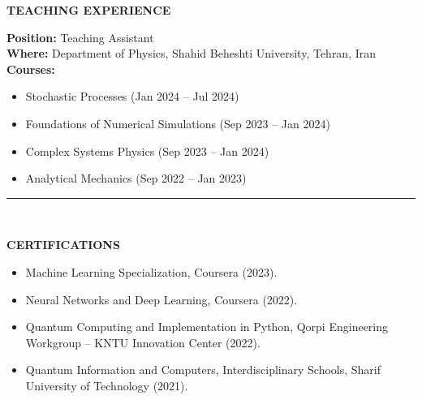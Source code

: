 \documentclass[11pt, b4paper]{cv}
\begin{document}
\textbf{TEACHING EXPERIENCE}

\textbf{Position:} Teaching Assistant\\
\textbf{Where:} \hspace{0.1in}Department of Physics, Shahid Beheshti University, Tehran, Iran\\
\textbf{Courses:}
\begin{itemize}
	\item Stochastic Processes (Jan 2024 – Jul 2024)
	\item Foundations of Numerical Simulations (Sep 2023 – Jan 2024)
	\item Complex Systems Physics (Sep 2023 – Jan 2024)
	\item Analytical Mechanics (Sep 2022 – Jan 2023)
\end{itemize}    



\vspace{-0.15in}
\rule{\textwidth}{1pt}\\
\vspace{-0.15in}

\textbf{CERTIFICATIONS}
\vspace{-0.1in}

\begin{itemize}
	\item Machine Learning Specialization, Coursera (2023).
	\item Neural Networks and Deep Learning, Coursera (2022).
	\item Quantum Computing and Implementation in Python, Qorpi Engineering Workgroup – KNTU Innovation Center (2022).
	\item Quantum Information and Computers, Interdisciplinary Schools, Sharif University of Technology (2021).
\end{itemize}
\end{document}
